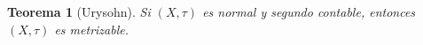 \documentclass{article}
\newtheorem{theorem}{Teorema}[section]
\theoremstyle{definition}
\theoremstyle{remark}
\numberwithin{equation}{section}
\renewcommand{\t}{\tau}
\newcommand{\fecha}[1]{\begin{flushright} \underline{#1} \end{flushright}}
\begin{document}
\begin{theorem}
  [Urysohn]
  Si $(X,\t)$ es normal y segundo contable, entonces $(X,\t)$ es metrizable.
\end{theorem}

\end{document}
